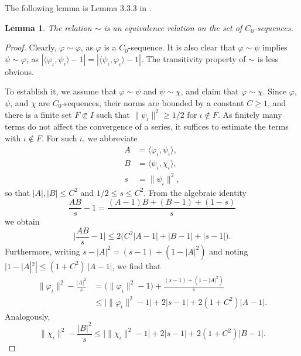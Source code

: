 \documentclass[twoside,11pt,letter]{article}
\theoremstyle{definition}
\theoremstyle{definition}
\theoremstyle{plain}
\newtheorem{lemma}[theorem]{Lemma}
\begin{document}
The following lemma is Lemma 3.3.3 in \cite{vN39}.
\begin{lemma}\label{equivLem}
The relation $\sim$ is an equivalence relation on the set of $C_0$-sequences.
\end{lemma}
\begin{proof}
Clearly, $\varphi\sim\varphi$, as $\varphi$ is a $C_0$-sequence. It is also clear that $\varphi\sim\psi$ implies $\psi\sim\varphi$, as $|\langle \varphi_\iota,\psi_\iota\rangle-1|=|\langle \psi_\iota,\varphi_\iota\rangle-1|$. The transitivity property of $\sim$ is less obvious.

To establish it, we assume that $\varphi\sim\psi$ and $\psi\sim\chi$, and claim that $\varphi\sim\chi$. Since $\varphi$, $\psi$, and $\chi$ are $C_0$-sequences, their norms are bounded by a constant $C\geq 1$, and there is a finite set $F\Subset I$ such that $\|\psi_\iota\|^2\geq 1/2$ for $\iota\notin F$. As finitely many terms do not affect the convergence of a series, it suffices to estimate the terms with $\iota\notin F$. For such $\iota$, we abbreviate
\begin{equation*}
\begin{split}
A&=\langle\varphi_\iota,\psi_\iota\rangle,\\
B&=\langle\psi_\iota,\chi_\iota\rangle,\\
s&=\|\psi_\iota\|^2,
\end{split}
\end{equation*}
so that $|A|,|B|\leq C^2$ and $1/2\leq s\leq C^2$. From the algebraic identity
\begin{equation*}
\frac{AB}{s}-1=\frac{(A-1)B+(B-1)+(1-s)}{s}
\end{equation*}
we obtain
\begin{equation}\label{firstTermEst}
\Big|\frac{AB}{s}-1\Big|\leq 2\big(C^2|A-1|+|B-1|+|s-1|\big).
\end{equation}
Furthermore, writing $s-|A|^2=(s-1)+(1-|A|^2)$ and noting $|1-|A|^2|\leq(1+C^2)\,|A-1|$, we find that
\begin{equation}\label{secondTermEst}
\begin{split}
\|\varphi_\iota\|^2-\frac{|A|^2}{s}&=\big(\|\varphi_\iota\|^2-1\big)+\frac{(s-1)+(1-|A|^2)}{s}\\
&\leq\big|\|\varphi_\iota\|^2-1\big|+2|s-1|+2(1+C^2)|A-1|.
\end{split}
\end{equation}
Analogously,
\begin{equation}\label{thirdTermEst}
\|\chi_\iota\|^2-\frac{|B|^2}{s}\leq\big|\|\chi_\iota\|^2-1\big|+2|s-1|+2(1+C^2)|B-1|.

\end{equation}
\end{proof}
\end{document}
